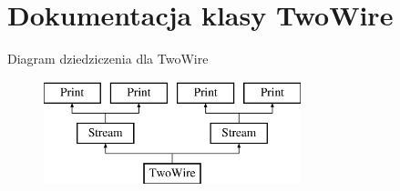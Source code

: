 \hypertarget{class_two_wire}{}\section{Dokumentacja klasy Two\+Wire}
\label{class_two_wire}
Diagram dziedziczenia dla Two\+Wire\begin{figure}[H]
\begin{center}
\leavevmode
\includegraphics[height=3.000000cm]{class_two_wire}
\end{center}
\end{figure}
